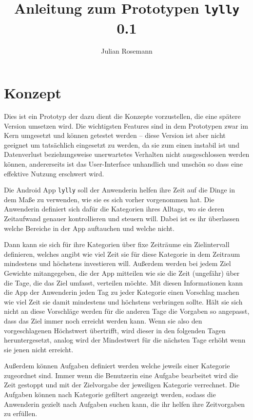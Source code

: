 \documentclass[10pt,a4paper]{article}
\title{\textbf{Anleitung zum Prototypen \texttt{lylly} 0.1}}
\author{Julian Rosemann}
\begin{document}
\maketitle
\section{Konzept}
Dies ist ein Prototyp der dazu dient die Konzepte vorzustellen, die eine spätere Version umsetzen wird. Die wichtigsten Features sind in dem Prototypen zwar im Kern umgesetzt und können getestet werden – diese Version ist aber nicht geeignet um tatsächlich eingesetzt zu werden, da sie zum einen instabil ist und Datenverlust beziehungsweise unerwartetes Verhalten nicht ausgeschlossen werden können, andererseits ist das User-Interface unhandlich und unschön so dass eine effektive Nutzung erschwert wird.

Die Android App \texttt{lylly} soll der Anwenderin helfen ihre Zeit auf die Dinge in dem Maße zu verwenden, wie sie es sich vorher vorgenommen hat. Die Anwenderin definiert sich dafür die Kategorien ihres Alltags, wo sie deren Zeitaufwand genauer kontrollieren und steuern will. Dabei ist es ihr überlassen welche Bereiche in der App auftauchen und welche nicht. %

Dann kann sie sich für ihre Kategorien über fixe Zeiträume ein Zielintervall definieren, welches angibt wie viel Zeit sie für diese Kategorie in dem Zeitraum mindestens und höchstens investieren will. Außerdem werden bei jedem Ziel Gewichte mitangegeben, die der App mitteilen wie sie die Zeit (ungefähr) über die Tage, die das Ziel umfasst, verteilen möchte. Mit diesen Informationen kann die App der Anwenderin jeden Tag zu jeder Kategorie einen Vorschlag machen wie viel Zeit sie damit mindestens und höchstens verbringen sollte. Hält sie sich nicht an diese Vorschläge werden für die anderen Tage die Vorgaben so angepasst, dass das Ziel immer noch erreicht werden kann. Wenn sie also den vorgeschlagenen Höchstwert übertrifft, wird dieser in den folgenden Tagen heruntergesetzt, analog wird der Mindestwert für die nächsten Tage erhöht wenn sie jenen nicht erreicht.

Außerdem können Aufgaben definiert werden welche jeweils einer Kategorie zugeordnet sind. Immer wenn die Benutzerin eine Aufgabe bearbeitet wird die Zeit gestoppt und mit der Zielvorgabe der jeweiligen Kategorie verrechnet. Die Aufgaben können nach Kategorie gefiltert angezeigt werden, sodass die Anwenderin gezielt nach Aufgaben suchen kann, die ihr helfen ihre Zeitvorgaben zu erfüllen.
\end{document}

